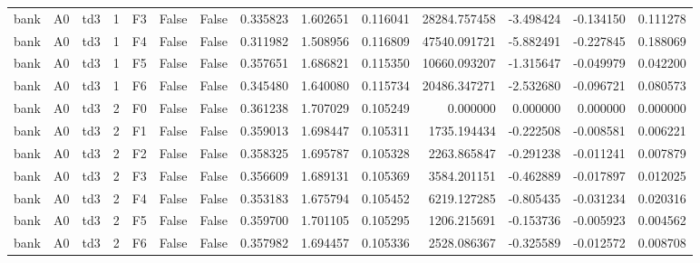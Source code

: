 \begin{tabular}{lllrlllrrrrrrr}
      bank &      A0 &       td3 &     1 &  F3 &           False &            False &  0.335823 &  1.602651 & 0.116041 &     28284.757458 &          -3.498424 &       -0.134150 &            0.111278 \\
      bank &      A0 &       td3 &     1 &  F4 &           False &            False &  0.311982 &  1.508956 & 0.116809 &     47540.091721 &          -5.882491 &       -0.227845 &            0.188069 \\
      bank &      A0 &       td3 &     1 &  F5 &           False &            False &  0.357651 &  1.686821 & 0.115350 &     10660.093207 &          -1.315647 &       -0.049979 &            0.042200 \\
      bank &      A0 &       td3 &     1 &  F6 &           False &            False &  0.345480 &  1.640080 & 0.115734 &     20486.347271 &          -2.532680 &       -0.096721 &            0.080573 \\
      bank &      A0 &       td3 &     2 &  F0 &           False &            False &  0.361238 &  1.707029 & 0.105249 &         0.000000 &           0.000000 &        0.000000 &            0.000000 \\
      bank &      A0 &       td3 &     2 &  F1 &           False &            False &  0.359013 &  1.698447 & 0.105311 &      1735.194434 &          -0.222508 &       -0.008581 &            0.006221 \\
      bank &      A0 &       td3 &     2 &  F2 &           False &            False &  0.358325 &  1.695787 & 0.105328 &      2263.865847 &          -0.291238 &       -0.011241 &            0.007879 \\
      bank &      A0 &       td3 &     2 &  F3 &           False &            False &  0.356609 &  1.689131 & 0.105369 &      3584.201151 &          -0.462889 &       -0.017897 &            0.012025 \\
      bank &      A0 &       td3 &     2 &  F4 &           False &            False &  0.353183 &  1.675794 & 0.105452 &      6219.127285 &          -0.805435 &       -0.031234 &            0.020316 \\
      bank &      A0 &       td3 &     2 &  F5 &           False &            False &  0.359700 &  1.701105 & 0.105295 &      1206.215691 &          -0.153736 &       -0.005923 &            0.004562 \\
      bank &      A0 &       td3 &     2 &  F6 &           False &            False &  0.357982 &  1.694457 & 0.105336 &      2528.086367 &          -0.325589 &       -0.012572 &            0.008708 \\

\end{tabular}
